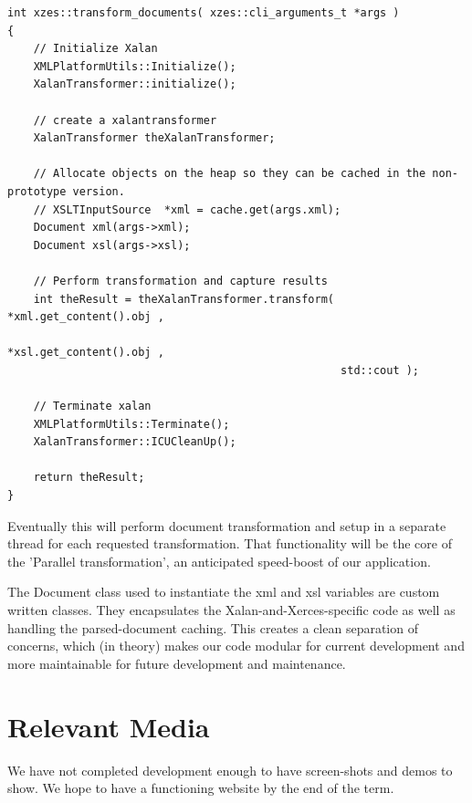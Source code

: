 \begin{lstlisting}
int xzes::transform_documents( xzes::cli_arguments_t *args )
{
    // Initialize Xalan
    XMLPlatformUtils::Initialize();
    XalanTransformer::initialize();

    // create a xalantransformer
    XalanTransformer theXalanTransformer;

    // Allocate objects on the heap so they can be cached in the non-prototype version.
    // XSLTInputSource  *xml = cache.get(args.xml);
    Document xml(args->xml);
    Document xsl(args->xsl);

    // Perform transformation and capture results
    int theResult = theXalanTransformer.transform( *xml.get_content().obj ,
                                                   *xsl.get_content().obj ,
                                                   std::cout );

    // Terminate xalan
    XMLPlatformUtils::Terminate();
    XalanTransformer::ICUCleanUp();

    return theResult;
}
\end{lstlisting}

Eventually this will perform document transformation and setup in a separate thread for each requested transformation.
That functionality will be the core of the 'Parallel transformation', an anticipated speed-boost of our application.

The Document class used to instantiate the xml and xsl variables are custom written classes.
They encapsulates the Xalan-and-Xerces-specific code as well as handling the parsed-document caching.
This creates a clean separation of concerns, which (in theory) makes our code modular for current development and more maintainable for future development and maintenance.

\section{Relevant Media}

We have not completed development enough to have screen-shots and demos to show.
We hope to have a functioning website by the end of the term.




\printbibliography


